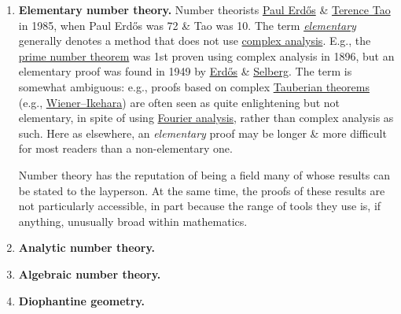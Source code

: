 \documentclass{article}
\begin{document}
\begin{enumerate}
	\item {\bf Elementary number theory.} {\sf Number theorists \href{https://en.wikipedia.org/wiki/Paul_Erd%C5%91s}{\sc Paul Erd\H{o}s} \& \href{https://en.wikipedia.org/wiki/Terence_Tao}{\sc Terence Tao} in 1985, when {\sc Paul Erd\H{o}s} was 72 \& Tao was 10.} The term \href{https://en.wikipedia.org/wiki/Elementary_proof}{\it elementary} generally denotes a method that does not use \href{https://en.wikipedia.org/wiki/Complex_analysis}{complex analysis}. E.g., the \href{https://en.wikipedia.org/wiki/Prime_number_theorem}{prime number theorem} was 1st proven using complex analysis in 1896, but an elementary proof was found in 1949 by \href{https://en.wikipedia.org/wiki/Paul_Erd%C5%91s}{\sc Erd\H{o}s} \& \href{https://en.wikipedia.org/wiki/Atle_Selberg}{Selberg}. The term is somewhat ambiguous: e.g., proofs based on complex \href{https://en.wikipedia.org/wiki/Tauberian_theorem}{Tauberian theorems} (e.g., \href{https://en.wikipedia.org/wiki/Wiener%E2%80%93Ikehara_theorem}{Wiener--Ikehara}) are often seen as quite enlightening but not elementary, in spite of using \href{https://en.wikipedia.org/wiki/Fourier_analysis}{Fourier analysis}, rather than complex analysis as such. Here as elsewhere, an {\it elementary} proof may be longer \& more difficult for most readers than a non-elementary one.
	
	Number theory has the reputation of being a field many of whose results can be stated to the layperson. At the same time, the proofs of these results are not particularly accessible, in part because the range of tools they use is, if anything, unusually broad within mathematics.
	\item {\bf Analytic number theory.}
	\item {\bf Algebraic number theory.}
	\item {\bf Diophantine geometry.}
\end{enumerate}
\end{document}
